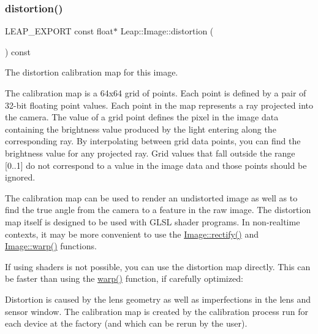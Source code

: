 \subsubsection{\texorpdfstring{distortion()}{distortion()}}
{\footnotesize\ttfamily L\+E\+A\+P\+\_\+\+E\+X\+P\+O\+RT const float$\ast$ Leap\+::\+Image\+::distortion (\begin{DoxyParamCaption}{ }\end{DoxyParamCaption}) const}

The distortion calibration map for this image.

The calibration map is a 64x64 grid of points. Each point is defined by a pair of 32-\/bit floating point values. Each point in the map represents a ray projected into the camera. The value of a grid point defines the pixel in the image data containing the brightness value produced by the light entering along the corresponding ray. By interpolating between grid data points, you can find the brightness value for any projected ray. Grid values that fall outside the range \mbox{[}0..1\mbox{]} do not correspond to a value in the image data and those points should be ignored.


\begin{DoxyCodeInclude}
\end{DoxyCodeInclude}


The calibration map can be used to render an undistorted image as well as to find the true angle from the camera to a feature in the raw image. The distortion map itself is designed to be used with G\+L\+SL shader programs. In non-\/realtime contexts, it may be more convenient to use the \hyperlink{class_leap_1_1_image_a76443f4064feb15dad132be15f9fa444}{Image\+::rectify()} and \hyperlink{class_leap_1_1_image_a8bb3e9747ecaba23b2a47043d823ee24}{Image\+::warp()} functions.

If using shaders is not possible, you can use the distortion map directly. This can be faster than using the {\ttfamily \hyperlink{class_leap_1_1_image_a8bb3e9747ecaba23b2a47043d823ee24}{warp()}} function, if carefully optimized\+:


\begin{DoxyCodeInclude}
\end{DoxyCodeInclude}


Distortion is caused by the lens geometry as well as imperfections in the lens and sensor window. The calibration map is created by the calibration process run for each device at the factory (and which can be rerun by the user).

